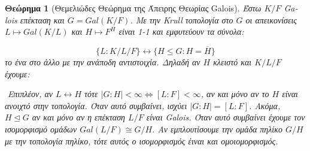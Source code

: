 \documentclass[oneside,a4paper]{article}
\newtheorem{theorem}{Θεώρημα}
\newcommand {\tl}{\textlatin}
\begin{document}
\begin{theorem}[Θεμελιώδες Θεώρημα της Άπειρης Θεωρίας \tl{Galois}]

Έστω $K/F$ \tl{Galois} επέκταση και $G=Gal(K/F)$. Με την \tl{Krull} τοπολογία στο $G$
οι απεικονίσεις $L \mapsto Gal(K/L)$ και $H \mapsto F^H$ είναι 1-1 και εμφυτεύουν τα σύνολα:

$$\{L : K/L/F \} \longleftrightarrow \{H \leq G: H = \overline H\}$$
το ένα στο άλλο με την ανάποδη αντιστοιχία. 
Δηλαδή αν $H$ κλειστό και $K/L/F$ έχουμε:
\begin{center}
\end{center}
\vspace{0.3truecm}

$ $\newline
Επιπλέον, αν $L \longleftrightarrow H$ τότε $|G:H| < \infty \iff [L:F] < \infty$, αν και μόνο αν το $H$ είναι ανοιχτό στην τοπολογία. Όταν αυτό συμβαίνει, ισχύει $|G:H| = [L:F]$. Ακόμα, $H \unlhd G$ αν και μόνο αν η επέκταση $L/F$ είναι \tl{Galois}. Όταν αυτό συμβαίνει έχουμε τον ισομορφισμό ομάδων $Gal(L/F) \cong G/H$. Αν εμπλουτίσουμε την ομάδα πηλίκο $G/H$ με την τοπολογία πηλίκο, τότε αυτός ο ισομορφισμός έιναι και ομοιομορφισμός.
\end{theorem}
\end{document}
